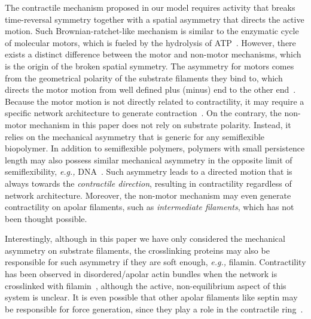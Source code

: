 \documentclass[twocolumn,prl,english]{revtex4-1}
\begin{document}
The contractile mechanism proposed in our model requires activity that 
breaks  time-reversal symmetry together with a spatial asymmetry that directs the active motion. Such Brownian-ratchet-like mechanism is similar to the enzymatic cycle of molecular motors, which is fueled by the hydrolysis of ATP~\cite{Julicher1997}. However, there exists a distinct difference between the motor and non-motor mechanisms, which is the origin of the broken spatial symmetry. The asymmetry for motors comes from the geometrical polarity of the substrate filaments they bind to, which directs the motor motion from well defined plus (minus) end to the other end~\cite{Magnasco1993}. Because the motor motion is not directly related to contractility, it may require a specific network architecture to generate contraction~\cite{Ennomani2016}. On the contrary, the non-motor mechanism in this paper does not rely on substrate polarity. Instead, it relies on the mechanical asymmetry that is generic for any semiflexible biopolymer.  In addition to semiflexible polymers, polymers with small persistence length may also possess similar mechanical asymmetry in the opposite limit of semiflexibility, {\it e.g.,} DNA~\cite{Marko1994}.  Such asymmetry leads to a directed motion that is always towards the \emph{contractile direction}, resulting in contractility regardless of network architecture. Moreover, the non-motor mechanism may even generate contractility on apolar filaments, such as {\it intermediate filaments}, which has not been thought possible. 

Interestingly, although in this paper we have only considered the mechanical asymmetry on substrate filaments, the crosslinking proteins may also be responsible for such asymmetry if they are soft enough, {\it e.g.,} filamin. Contractility has been observed in disordered/apolar actin bundles when  the network is crosslinked with filamin~\cite{Weirich2017}, although the active, non-equilibrium aspect of this system is unclear. It is even possible that other apolar filaments like septin may be responsible for force generation, since they play a role in the contractile ring~\cite{Mavrakis2014,Valadares2017}. 
\end{document}

